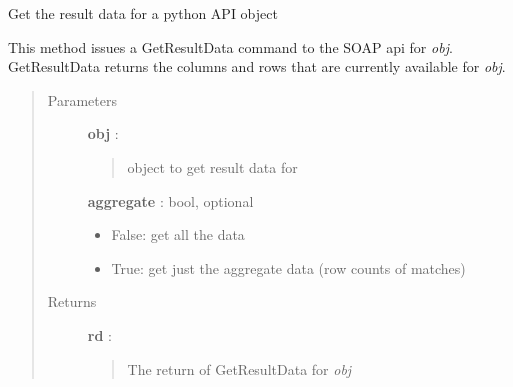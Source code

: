 \documentclass[letterpaper,10pt,english]{sphinxmanual}
\begin{document}
\begin{fulllineitems}
\label{pytan.handler:pytan.handler.Handler.get_result_data}
Get the result data for a python API object

This method issues a GetResultData command to the SOAP api for \emph{obj}. GetResultData returns the columns and rows that are currently available for \emph{obj}.
\begin{quote}\begin{description}
\item[{Parameters}] \leavevmode
\textbf{obj} : {\hyperref[taniumpy.object_types:taniumpy.object_types.base.BaseType]{}}
\begin{quote}

object to get result data for
\end{quote}

\textbf{aggregate} : bool, optional
\begin{itemize}
\item {} 
False: get all the data

\item {} 
True: get just the aggregate data (row counts of matches)

\end{itemize}

\item[{Returns}] \leavevmode
\textbf{rd} : {\hyperref[taniumpy.object_types:taniumpy.object_types.result_set.ResultSet]{}}
\begin{quote}

The return of GetResultData for \emph{obj}
\end{quote}

\end{description}\end{quote}

\end{fulllineitems}

\end{document}
